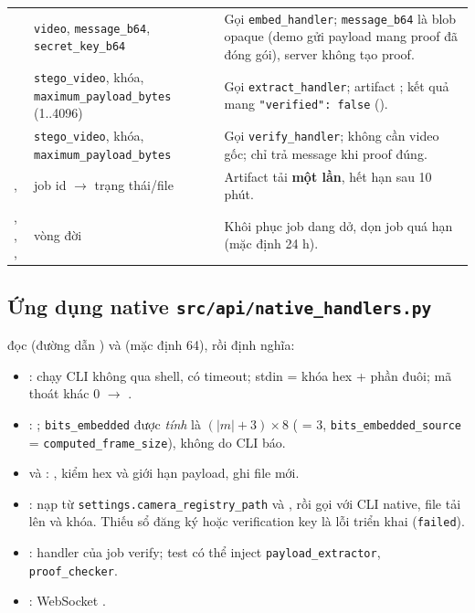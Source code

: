 \documentclass[11pt,a4paper]{article}
\begin{document}
\begin{longtable}{P{.34\textwidth}P{.28\textwidth}P{.29\textwidth}}
 & \texttt{video}, \texttt{message\_b64}, \texttt{secret\_key\_b64} & Gọi \texttt{embed\_handler}; \texttt{message\_b64} là blob opaque (demo gửi payload mang proof đã đóng gói), server không tạo proof. \\
 & \texttt{stego\_video}, khóa, \texttt{maximum\_payload\_bytes} (1..4096) & Gọi \texttt{extract\_handler}; artifact ; kết quả mang \texttt{"verified": false} (). \\
 & \texttt{stego\_video}, khóa, \texttt{maximum\_payload\_bytes} & Gọi \texttt{verify\_handler}; không cần video gốc;  chỉ trả message khi proof đúng. \\
,  & job id $\to$ trạng thái/file & Artifact tải \textbf{một lần}, hết hạn sau 10 phút. \\
, , ,  & vòng đời & Khôi phục job dang dở, dọn job quá hạn (mặc định 24 h). \\
\bottomrule\end{longtable}

\subsection{Ứng dụng native \texorpdfstring{\texttt{src/api/native\_handlers.py}}{native\_handlers.py}}

 đọc  (đường dẫn
) và  (mặc định 64), rồi định
nghĩa:

\begin{itemize}
  \item {}: chạy CLI không qua shell, có timeout; stdin = khóa hex +
  phần đuôi; mã thoát khác 0 $\to$ .
  \item {}: ; \texttt{bits\_embedded}
  được \emph{tính} là $(|m|+3)\times 8$ ( = 3,
  \texttt{bits\_embedded\_source} = \texttt{computed\_frame\_size}), không do CLI báo.
  \item {} và :
  , kiểm hex và giới hạn payload, ghi file mới.
  \item {}: nạp  từ
  \texttt{settings.camera\_registry\_path} và ,
  rồi gọi  với CLI native, file tải lên và khóa. Thiếu
  sổ đăng ký hoặc verification key là lỗi triển khai (\texttt{failed}).
  \item {}: handler
  của job verify; test có thể inject \texttt{payload\_extractor}, \texttt{proof\_checker}.
  \item {}: WebSocket .
\end{itemize}
\end{document}
